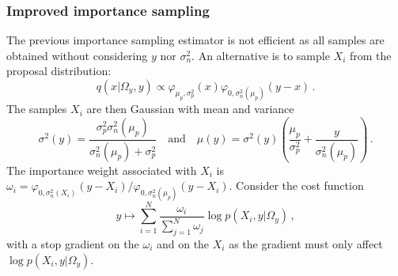 \subsubsection{Improved importance sampling}
The previous importance sampling estimator is not efficient as all samples are obtained without considering $y$ nor $\sigma_n^2$. An alternative is to sample $X_i$ from the proposal distribution:
$$
q(x|\Omega_y,y)\propto \varphi_{\mu_p,\sigma_p^2}(x)   \varphi_{0,\sigma_n^2(\mu_p)}(y-x)\,.
$$
The samples $X_i$ are then Gaussian with mean and variance
$$
\sigma^2(y) = \frac{\sigma_p^2\sigma_n^2(\mu_p)}{\sigma_n^2(\mu_p)+\sigma_p^2} \quad\mbox{and}\quad \mu(y) = \sigma^2(y)\left(\frac{\mu_p}{\sigma_p^2} + \frac{y}{\sigma_n^2(\mu_p)}\right)\,.$$
The importance weight associated with $X_i$ is $\omega_i = \varphi_{0,\sigma_n^2(X_i)}(y-X_i)/\varphi_{0,\sigma_n^2(\mu_p)}(y-X_i)$. Consider the cost function
$$
y \mapsto \sum_{i=1}^N\frac{\omega_i}{\sum_{j=1}^N\omega_j}  \log p(X_i,y|\Omega_y)\,,
$$
with a stop gradient on the $\omega_i$ and on the $X_i$ as the gradient must only affect $ \log p(X_i,y|\Omega_y)$.


